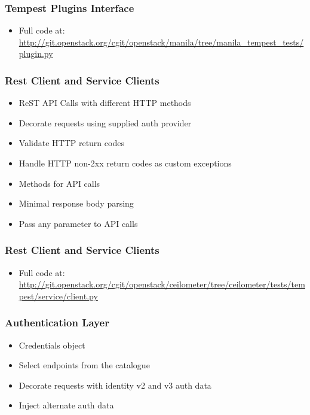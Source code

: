 \documentclass[aspectratio=169,11pt,hyperref={colorlinks=true}]{beamer}
\begin{document}
\begin{frame}
    \frametitle{Tempest Plugins Interface}
    
    \begin{itemize}
        \item \tiny Full code at: \href{http://git.openstack.org/cgit/openstack/manila/tree/manila_tempest_tests/plugin.py}{http://git.openstack.org/cgit/openstack/manila/tree/manila\_tempest\_tests/plugin.py}
    \end{itemize}
\end{frame}

\begin{frame}
    \frametitle{Rest Client and Service Clients}
    \begin{itemize}
        \item ReST API Calls with different HTTP methods
        \item Decorate requests using supplied auth provider
        \item Validate HTTP return codes
        \item Handle HTTP non-2xx return codes as custom exceptions
    \end{itemize}
    \begin{itemize}
        \item Methods for API calls
        \item Minimal response body parsing
        \item Pass any parameter to API calls
    \end{itemize}
\end{frame}

\begin{frame}
    \frametitle{Rest Client and Service Clients}
    
    \begin{itemize}
        \item \tiny Full code at: \href{http://git.openstack.org/cgit/openstack/ceilometer/tree/ceilometer/tests/tempest/service/client.py}{http://git.openstack.org/cgit/openstack/ceilometer/tree/ceilometer/tests/tempest/service/client.py}
    \end{itemize}
\end{frame}

\begin{frame}
    \frametitle{Authentication Layer}
    \begin{itemize}
        \item Credentials object
        \item Select endpoints from the catalogue
        \item Decorate requests with identity v2 and v3 auth data
        \item Inject alternate auth data
    \end{itemize}
\end{frame}
\end{document}
